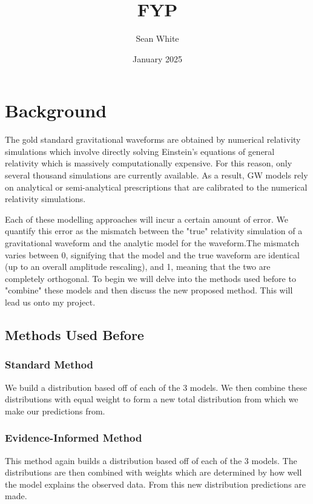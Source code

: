 \documentclass{article}
\title{FYP }
\author{Sean White}
\date{January 2025}
\begin{document}
\maketitle

\section{Background}

The gold standard gravitational waveforms are obtained by numerical relativity simulations which involve directly solving Einstein's equations of general relativity which is massively computationally expensive. For this reason, only several thousand simulations are currently available. As a result, GW models rely on analytical or semi-analytical prescriptions that are calibrated to the numerical relativity simulations.

\par
\noindent
Each of these modelling approaches will incur a certain amount of error. We quantify this error as the mismatch between the "true" relativity simulation of a gravitational waveform and the analytic model for the waveform.The mismatch \cite{owen1995template} varies between 0, signifying that the model and the true waveform are identical (up to an overall amplitude rescaling), and 1, meaning that the two are completely orthogonal. To begin we will delve into the methods used before to "combine" these models and then discuss the new proposed method. This will lead us onto my project.



\subsection*{Methods Used Before}

\subsubsection*{Standard Method}
We build a distribution based off of each of the 3 models. We then combine these distributions with equal weight to form a new total distribution from which we make our predictions from.

\subsubsection*{Evidence-Informed Method}
This method again builds a distribution based off of each of the 3 models. The distributions are then combined with weights which are determined by how well the model explains the observed data. From this new distribution predictions are made.
\end{document}
